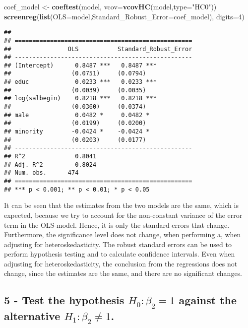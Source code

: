 \documentclass[
]{article}
\newenvironment{Shaded}{\begin{snugshade}}{\end{snugshade}}
\newcommand{\AttributeTok}[1]{\textcolor[rgb]{0.13,0.29,0.53}{#1}}
\newcommand{\DecValTok}[1]{\textcolor[rgb]{0.00,0.00,0.81}{#1}}
\newcommand{\FunctionTok}[1]{\textcolor[rgb]{0.13,0.29,0.53}{\textbf{#1}}}
\newcommand{\NormalTok}[1]{#1}
\newcommand{\OtherTok}[1]{\textcolor[rgb]{0.56,0.35,0.01}{#1}}
\newcommand{\StringTok}[1]{\textcolor[rgb]{0.31,0.60,0.02}{#1}}
\begin{document}
\begin{Shaded}
\begin{Highlighting}[]
\NormalTok{coef\_model }\OtherTok{\textless{}{-}} \FunctionTok{coeftest}\NormalTok{(model, }\AttributeTok{vcov=}\FunctionTok{vcovHC}\NormalTok{(model,}\AttributeTok{type=}\StringTok{"HC0"}\NormalTok{))}
\FunctionTok{screenreg}\NormalTok{(}\FunctionTok{list}\NormalTok{(}\AttributeTok{OLS=}\NormalTok{model,}\AttributeTok{Standard\_Robust\_Error=}\NormalTok{coef\_model), }\AttributeTok{digits=}\DecValTok{4}\NormalTok{)}
\end{Highlighting}
\end{Shaded}

\begin{verbatim}
## 
## ==================================================
##                OLS           Standard_Robust_Error
## --------------------------------------------------
## (Intercept)      0.8487 ***   0.8487 ***          
##                 (0.0751)     (0.0794)             
## educ             0.0233 ***   0.0233 ***          
##                 (0.0039)     (0.0035)             
## log(salbegin)    0.8218 ***   0.8218 ***          
##                 (0.0360)     (0.0374)             
## male             0.0482 *     0.0482 *            
##                 (0.0199)     (0.0200)             
## minority        -0.0424 *    -0.0424 *            
##                 (0.0203)     (0.0177)             
## --------------------------------------------------
## R^2              0.8041                           
## Adj. R^2         0.8024                           
## Num. obs.      474                                
## ==================================================
## *** p < 0.001; ** p < 0.01; * p < 0.05
\end{verbatim}

It can be seen that the estimates from the two models are the same,
which is expected, because we try to account for the non-constant
variance of the error term in the OLS-model. Hence, it is only the
standard errors that change. Furthermore, the significance level does
not change, when performing a, when adjusting for heteroskedasticity.
The robust standard errors can be used to perform hypothesis testing and
to calculate confidence intervals. Even when adjusting for
heteroskedasticity, the conclusion from the regressions does not change,
since the estimates are the same, and there are no significant changes.

\subsection{\texorpdfstring{5 - Test the hypothesis \(H_0:\beta_2 = 1\)
against the alternative
\(H_1: \beta_2 \neq 1\).}{5 - Test the hypothesis H\_0:\textbackslash beta\_2 = 1 against the alternative H\_1: \textbackslash beta\_2 \textbackslash neq 1.}}\label{test-the-hypothesis-h_0beta_2-1-against-the-alternative-h_1-beta_2-neq-1.}
\end{document}
